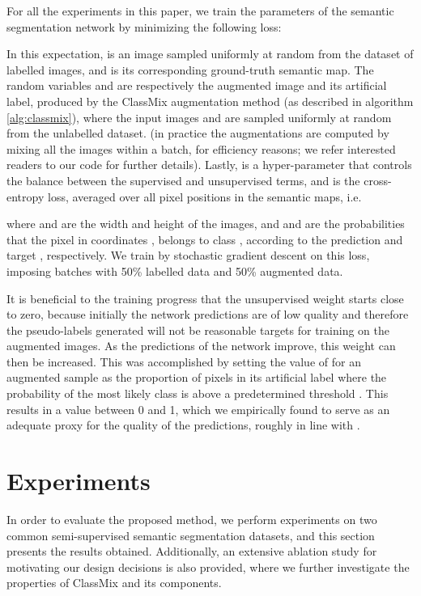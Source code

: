 \documentclass[10pt,twocolumn,letterpaper]{article}
\begin{document}
For all the experiments in this paper, we train the parameters of the semantic segmentation network  by minimizing the following loss:

In this expectation,  is an image sampled uniformly at random from the dataset of labelled images, and  is its corresponding ground-truth semantic map. The random variables  and  are respectively the augmented image and its artificial label, produced by the ClassMix augmentation method (as described in algorithm \ref{alg:classmix}), where the input images  and  are sampled uniformly at random from the unlabelled dataset. (in practice the augmentations are computed by mixing all the images within a batch, for efficiency reasons; we refer interested readers to our code for further details). Lastly,  is a hyper-parameter that controls the balance between the supervised and unsupervised terms, and  is the cross-entropy loss, averaged over all pixel positions in the semantic maps, i.e.

where  and  are the width and height of the images, and  and  are the probabilities that the pixel in coordinates ,  belongs to class , according to the prediction  and target , respectively. We train  by stochastic gradient descent on this loss, imposing batches with 50\% labelled data and 50\% augmented data. 

It is beneficial to the training progress that the unsupervised weight  starts close to zero, because initially the network predictions are of low quality and therefore the pseudo-labels generated will not be reasonable targets for training on the augmented images. As the predictions of the network improve, this weight can then be increased. 
This was accomplished by setting the value of  for an augmented sample as the proportion of pixels in its artificial label where the probability of the most likely class is above a predetermined threshold . This results in a value between 0 and 1, which we empirically found to serve as an adequate proxy for the quality of the predictions, roughly in line with \cite{French,FrenchSelfEnsembling}. 





\section{Experiments}
\label{sec:experiments}

In order to evaluate the proposed method, we perform experiments on two common semi-supervised semantic segmentation datasets, and this section presents the results obtained. Additionally, an extensive ablation study for motivating our design decisions is also provided, where we further investigate the properties of ClassMix and its components.
\end{document}

